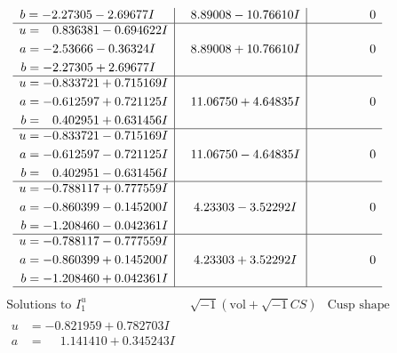 \documentclass[1p]{elsarticle_modified}
\theoremstyle{definition}
\newcommand{\I}{\sqrt{-1}}
\begin{document}
$$\begin{array}{c|c|c}
\begin{aligned}
b &= -2.27305 - 2.69677 I\end{aligned}
 & \phantom{-}8.89008 - 10.76610 I & \phantom{-0.000000 } 0 \\ \hline\begin{aligned}
u &= \phantom{-}0.836381 - 0.694622 I \\
a &= -2.53666 - 0.36324 I \\
b &= -2.27305 + 2.69677 I\end{aligned}
 & \phantom{-}8.89008 + 10.76610 I & \phantom{-0.000000 } 0 \\ \hline\begin{aligned}
u &= -0.833721 + 0.715169 I \\
a &= -0.612597 + 0.721125 I \\
b &= \phantom{-}0.402951 + 0.631456 I\end{aligned}
 & \phantom{-}11.06750 + 4.64835 I & \phantom{-0.000000 } 0 \\ \hline\begin{aligned}
u &= -0.833721 - 0.715169 I \\
a &= -0.612597 - 0.721125 I \\
b &= \phantom{-}0.402951 - 0.631456 I\end{aligned}
 & \phantom{-}11.06750 - 4.64835 I & \phantom{-0.000000 } 0 \\ \hline\begin{aligned}
u &= -0.788117 + 0.777559 I \\
a &= -0.860399 - 0.145200 I \\
b &= -1.208460 - 0.042361 I\end{aligned}
 & \phantom{-}4.23303 - 3.52292 I & \phantom{-0.000000 } 0 \\ \hline\begin{aligned}
u &= -0.788117 - 0.777559 I \\
a &= -0.860399 + 0.145200 I \\
b &= -1.208460 + 0.042361 I\end{aligned}
 & \phantom{-}4.23303 + 3.52292 I & \phantom{-0.000000 } 0\\
 \hline 
 \end{array}$$\newpage$$\begin{array}{c|c|c}  
\text{Solutions to }I^u_{1}& \I (\text{vol} + \sqrt{-1}CS) & \text{Cusp shape}\\
 \hline 
\begin{aligned}
u &= -0.821959 + 0.782703 I \\
a &= \phantom{-}1.141410 + 0.345243 I \\

\end{aligned}
\end{array}$$
\end{document}
